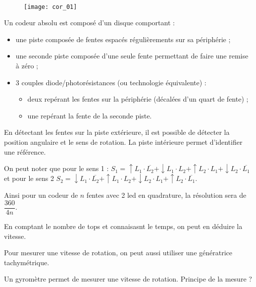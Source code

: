 \ifprof
\begin{corrige} ~\\

\begin{figure}[H]
\centering
\texttt{[image: cor\_01]}
\end{figure}

Un codeur absolu est composé d’un disque comportant :
\begin{itemize}
\item une piste composée de fentes espacés régulièrements sur sa périphérie ;
\item une seconde piste composée d’une seule fente permettant de faire une remise à zéro ;
\item 3 couples diode/photorésistances (ou technologie équivalente) :
\begin{itemize}
\item deux repérant les fentes sur la périphérie (décalées d’un quart de fente) ;
\item une repérant la fente de la seconde piste.
\end{itemize}
\end{itemize}
En détectant les fentes sur la piste extérieure, il est possible de détecter la position angulaire et le sens de rotation. 
La piste intérieure permet d’identifier une référence.

On peut noter que pour le sens 1 : 
$S_1 = \uparrow L_1 \cdot \overline{L_2} + \downarrow L_1 \cdot {L_2} +  \uparrow L_2 \cdot {L_1} + \downarrow L_2 \cdot \overline{L_1}$ et pour le sens 2
$S_2 = \downarrow L_1 \cdot \overline{L_2} + \uparrow L_1 \cdot {L_2} +  \downarrow L_2 \cdot {L_1} + \uparrow L_2 \cdot \overline{L_1}$.

Ainsi pour un codeur de $n$ fentes avec 2 led en quadrature, la résolution sera de $\dfrac{360}{4n}$.

En comptant le nombre de tops et connaisasnt le temps, on peut en déduire la vitesse. 

Pour mesurer une vitesse de rotation, on peut aussi utiliser une génératrice tachymétrique. 

\end{corrige}
\else
\fi

\ifprof
\begin{corrige}

Un gyromètre permet de mesurer une vitesse de rotation. Principe de la mesure ?
\end{corrige}
\else
\fi
%
%


